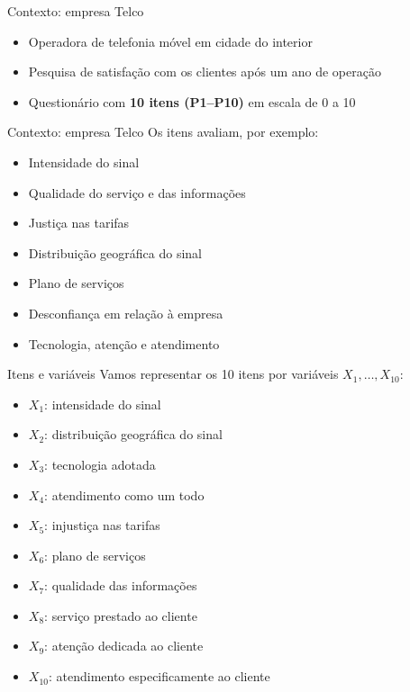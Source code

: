 \documentclass[
  ignorenonframetext,
  aspectratio=169,
]{beamer}
\providecommand{\tightlist}{%
  \setlength{\itemsep}{0pt}\setlength{\parskip}{0pt}}
\begin{document}
\begin{frame}{Contexto: empresa Telco}
\label{contexto-empresa-telco}
\begin{itemize}
\tightlist
\item
  Operadora de telefonia móvel em cidade do interior
\item
  Pesquisa de satisfação com os clientes após um ano de operação
\item
  Questionário com \textbf{10 itens (P1--P10)} em escala de 0 a 10
\end{itemize}
\end{frame}

\begin{frame}{Contexto: empresa Telco}
\label{contexto-empresa-telco-1}
Os itens avaliam, por exemplo:

\begin{itemize}
\tightlist
\item
  Intensidade do sinal
\item
  Qualidade do serviço e das informações
\item
  Justiça nas tarifas
\item
  Distribuição geográfica do sinal
\item
  Plano de serviços
\item
  Desconfiança em relação à empresa
\item
  Tecnologia, atenção e atendimento
\end{itemize}
\end{frame}

\begin{frame}{Itens e variáveis}
\label{itens-e-variuxe1veis}
Vamos representar os 10 itens por variáveis \(X_1, \ldots, X_{10}\):

\begin{itemize}
\tightlist
\item
  \(X_1\): intensidade do sinal
\item
  \(X_2\): distribuição geográfica do sinal
\item
  \(X_3\): tecnologia adotada
\item
  \(X_4\): atendimento como um todo
\item
  \(X_5\): injustiça nas tarifas
\item
  \(X_6\): plano de serviços
\item
  \(X_7\): qualidade das informações
\item
  \(X_8\): serviço prestado ao cliente
\item
  \(X_9\): atenção dedicada ao cliente
\item
  \(X_{10}\): atendimento especificamente ao cliente
\end{itemize}
\end{frame}
\end{document}
